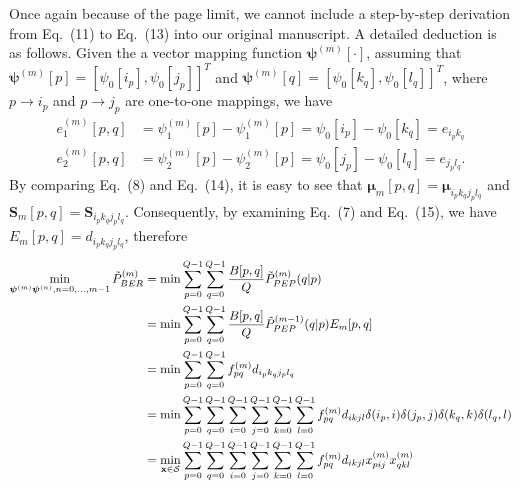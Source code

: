 \documentclass[onecolumn, 11pt, draftclsnofoot]{IEEEtran}
\begin{document}
Once again because of the page limit, we cannot include a step-by-step
derivation from Eq.~(11) to Eq.~(13) into our original manuscript. A detailed
deduction is as follows. Given the a vector mapping function
$\bm{\psi}^{(m)}[\cdot]$, assuming that $\bm{\psi}^{(m)}[p] = [\psi_0[i_p],
\psi_0[j_p]]^T$ and $\bm{\psi}^{(m)}[q] = [\psi_0[k_q], \psi_0[l_q]]^T$,
where $p\rightarrow i_p$ and $p\rightarrow j_p$ are one-to-one mappings, we
have
\begin{subequations}
  \begin{align}
    e_1^{(m)}[p,q] & = \psi_1^{(m)}[p] - \psi_1^{(m)}[p] =\psi_0[i_p] -
    \psi_0[k_q] = e_{i_pk_q} \\
    e_2^{(m)}[p,q] & = \psi_2^{(m)}[p] - \psi_2^{(m)}[p] =\psi_0[j_p] -
    \psi_0[l_q] = e_{j_pl_q}. 
  \end{align}
\end{subequations}
By comparing Eq.~(8) and Eq.~(14), it is easy to see that $\bm{\mu}_m[p,q] =
\bm{\mu}_{i_pk_qj_pl_q}$ and $\mathbf{S}_m[p,q] = \mathbf{S}_{i_pk_qj_pl_q}$.
Consequently, by examining Eq.~(7) and Eq.~(15), we have $E_m[p,q] =
d_{{i_pk_qj_pl_q}}$, therefore
\begin{align}
  \min_{\bm{\psi}^{(m)}\bm{\psi}^{(n)},n=0,\ldots,m-1}\tilde{P}_{BER}^{(m)}
  & = \min \sum_{p=0}^{Q - 1}\sum_{q=0}^{Q - 1}\frac{B[p,
  q]}{Q}\tilde{P}_{PEP}^{(m)}(q|p) \notag \\
  & = \min \sum_{p=0}^{Q - 1}\sum_{q=0}^{Q - 1}\frac{B[p,
  q]}{Q}\tilde{P}_{PEP}^{(m - 1)}(q|p) E_m[p, q] \notag \\
  & = \min \sum_{p=0}^{Q - 1}\sum_{q=0}^{Q - 1} f_{pq}^{(m)} d_{{i_pk_qj_pl_q}}
  \notag \\
  & = \min \sum_{p=0}^{Q - 1} \sum_{q=0}^{Q - 1} \sum_{i=0}^{Q - 1}
  \sum_{j=0}^{Q - 1} \sum_{k=0}^{Q - 1} \sum_{l=0}^{Q - 1}f_{pq}^{(m)}
  d_{ikjl}\delta(i_p,i)\delta(j_p,j)\delta(k_q,k)\delta(l_q,l) \notag
  \\
  &= \min_{\mathbf{x}\in\mathcal{S}} \sum_{p=0}^{Q - 1} \sum_{q=0}^{Q - 1}
  \sum_{i=0}^{Q - 1}
  \sum_{j=0}^{Q - 1} \sum_{k=0}^{Q - 1} \sum_{l=0}^{Q - 1}f_{pq}^{(m)}
  d_{ikjl} x_{pij}^{(m)}x_{qkl}^{(m)}
\end{align}
\end{document}
